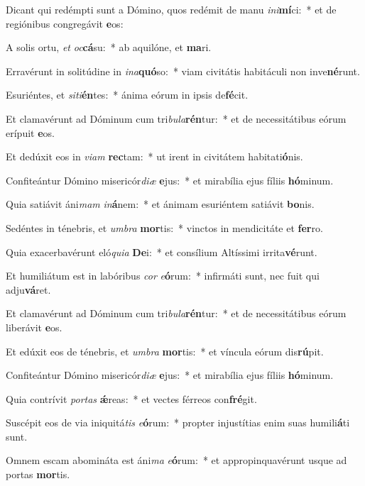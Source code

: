\item Dicant qui redémpti sunt a Dómino, quos redémit de manu \textit{in}\textit{i}\textbf{mí}ci:~* et de regiónibus congregávit \textbf{e}os:
\item A solis ortu, \textit{et} \textit{oc}\textbf{cá}su:~* ab aquilóne, et \textbf{ma}ri.
\item Erravérunt in solitúdine in \textit{in}\textit{a}\textbf{quó}so:~* viam civitátis habitáculi non inve\textbf{né}runt.
\item Esuriéntes, et \textit{si}\textit{ti}\textbf{én}tes:~* ánima eórum in ipsis de\textbf{fé}cit.
\item Et clamavérunt ad Dóminum cum tri\textit{bu}\textit{la}\textbf{rén}tur:~* et de necessitátibus eórum erípuit \textbf{e}os.
\item Et dedúxit eos in \textit{vi}\textit{am} \textbf{rec}tam:~* ut irent in civitátem habitati\textbf{ó}nis.
\item Confiteántur Dómino misericór\textit{di}\textit{æ} \textbf{e}jus:~* et mirabília ejus fíliis \textbf{hó}minum.
\item Quia satiávit áni\textit{mam} \textit{in}\textbf{á}nem:~* et ánimam esuriéntem satiávit \textbf{bo}nis.
\item Sedéntes in ténebris, et \textit{um}\textit{bra} \textbf{mor}tis:~* vinctos in mendicitáte et \textbf{fer}ro.
\item Quia exacerbavérunt eló\textit{qui}\textit{a} \textbf{De}i:~* et consílium Altíssimi irrita\textbf{vé}runt.
\item Et humiliátum est in labóribus \textit{cor} \textit{e}\textbf{ó}rum:~* infirmáti sunt, nec fuit qui adju\textbf{vá}ret.
\item Et clamavérunt ad Dóminum cum tri\textit{bu}\textit{la}\textbf{rén}tur:~* et de necessitátibus eórum liberávit \textbf{e}os.
\item Et edúxit eos de ténebris, et \textit{um}\textit{bra} \textbf{mor}tis:~* et víncula eórum dis\textbf{rú}pit.
\item Confiteántur Dómino misericór\textit{di}\textit{æ} \textbf{e}jus:~* et mirabília ejus fíliis \textbf{hó}minum.
\item Quia contrívit \textit{por}\textit{tas} \textbf{ǽ}reas:~* et vectes férreos con\textbf{fré}git.
\item Suscépit eos de via iniquitá\textit{tis} \textit{e}\textbf{ó}rum:~* propter injustítias enim suas humili\textbf{á}ti sunt.
\item Omnem escam abomináta est áni\textit{ma} \textit{e}\textbf{ó}rum:~* et appropinquavérunt usque ad portas \textbf{mor}tis.
